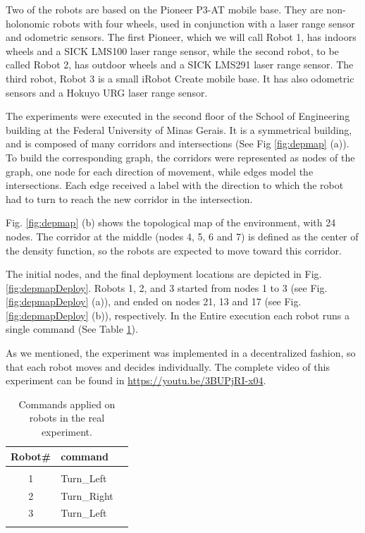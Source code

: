 \documentclass[smallcondensed]{svjour3}
\begin{document}
Two of the robots are based on the Pioneer P3-AT mobile base. They are non-holonomic robots with four wheels, used in conjunction with a laser range sensor and odometric sensors. The first Pioneer, which we will call Robot 1, has indoors wheels and a SICK LMS100 laser range sensor, while the second robot, to be called Robot 2, has outdoor wheels and a SICK LMS291 laser range sensor. 
%
The third robot, Robot 3 is a small iRobot Create mobile base. It has also odometric sensors and a Hokuyo URG laser range sensor. 

The experiments were executed in the second floor of the School of Engineering building at the Federal University of Minas Gerais. It is a symmetrical building, and is composed of many corridors and intersections (See Fig \ref{fig:depmap} (a)). To build the corresponding graph, the corridors were represented as nodes of the graph, one node for each direction of movement, while edges model the intersections. Each edge received a label with the direction to which the robot had to turn to reach the new corridor in the intersection.

Fig. \ref{fig:depmap} (b) shows the topological map of the environment, with 24 nodes. The corridor at the middle (nodes 4, 5, 6 and 7) is defined as the center of the density function, so the robots are expected to move toward this corridor.

The initial nodes, and the final deployment locations are depicted in Fig. \ref{fig:depmapDeploy}. Robots 1, 2, and 3 started from nodes 1 to 3 (see Fig. \ref{fig:depmapDeploy} (a)), and ended on nodes 21, 13 and 17 (see Fig. \ref{fig:depmapDeploy} (b)), respectively. In the Entire execution each robot runs a single command (See Table \ref{tbl:commands}).

As we mentioned, the experiment was implemented in a decentralized fashion, so that each robot moves and decides individually. The complete video of this experiment can be found in \href{https://youtu.be/3BUPjRI-x04}{https://youtu.be/3BUPjRI-x04}.

\begin{table}[H]
\centering
\caption{Commands applied on robots in the real experiment. }
\label{tbl:commands}
\begin{tabular}{cm{2cm}m{1.2cm}}
Robot\#    & command    \\
\hline\\
1   & Turn\_Left   \\
2 &  Turn\_Right \\
3 & Turn\_Left \\
\hline\\
\end{tabular}
\end{table}
\end{document}
